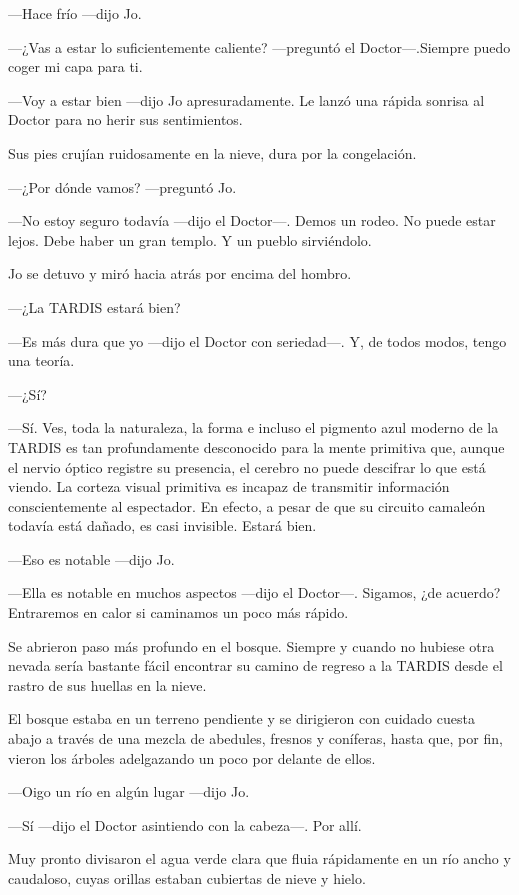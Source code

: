 ---Hace frío ---dijo Jo.

---¿Vas a estar lo suficientemente caliente? ---preguntó el
Doctor---.Siempre puedo coger mi capa para ti.

---Voy a estar bien ---dijo Jo apresuradamente. Le lanzó una rápida
sonrisa al Doctor para no herir sus sentimientos.

Sus pies crujían ruidosamente en la nieve, dura por la congelación.

---¿Por dónde vamos? ---preguntó Jo.

---No estoy seguro todavía ---dijo el Doctor---. Demos un rodeo. No
puede estar lejos. Debe haber un gran templo. Y un pueblo sirviéndolo.

Jo se detuvo y miró hacia atrás por encima del hombro.

---¿La TARDIS estará bien?

---Es más dura que yo ---dijo el Doctor con seriedad---. Y, de todos
modos, tengo una teoría.

---¿Sí?

---Sí. Ves, toda la naturaleza, la forma e incluso el pigmento azul
moderno de la TARDIS es tan profundamente desconocido para la mente
primitiva que, aunque el nervio óptico registre su presencia, el cerebro
no puede descifrar lo que está viendo. La corteza visual primitiva es
incapaz de transmitir información conscientemente al espectador. En
efecto, a pesar de que su circuito camaleón todavía está dañado, es casi
invisible. Estará bien.

---Eso es notable ---dijo Jo.

---Ella es notable en muchos aspectos ---dijo el Doctor---. Sigamos, ¿de
acuerdo? Entraremos en calor si caminamos un poco más rápido.

Se abrieron paso más profundo en el bosque. Siempre y cuando no hubiese
otra nevada sería bastante fácil encontrar su camino de regreso a la
TARDIS desde el rastro de sus huellas en la nieve.

El bosque estaba en un terreno pendiente y se dirigieron con cuidado
cuesta abajo a través de una mezcla de abedules, fresnos y coníferas,
hasta que, por fin, vieron los árboles adelgazando un poco por delante
de ellos.

---Oigo un río en algún lugar ---dijo Jo.

---Sí ---dijo el Doctor asintiendo con la cabeza---. Por allí.

Muy pronto divisaron el agua verde clara que fluia rápidamente en un río
ancho y caudaloso, cuyas orillas estaban cubiertas de nieve y hielo.

